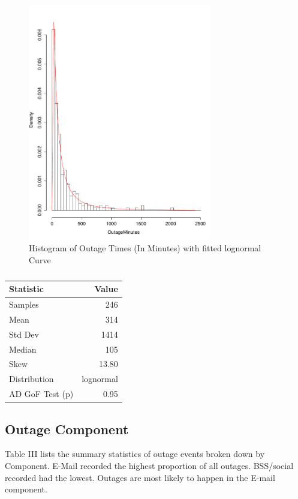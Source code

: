 \documentclass[conference]{IEEEtran}
\begin{document}
\begin{figure}
\begin{center}
\includegraphics[width=8cm]{graph1.pdf} 
\caption{ Histogram of Outage Times (In Minutes) with fitted lognormal Curve}
\end{center}
\label{fig:outagedistribution}
\end{figure}


\begin {table}
\caption{}
\begin{center}
\begin{tabular}{l | r} Statistic & Value 
\\ \hline Samples & 246
\\ Mean & 314
\\ Std Dev & 1414
\\ Median & 105
\\ Skew & 13.80
\\ Distribution & lognormal
\\AD GoF Test (p) & 0.95
\end{tabular}
\end{center}
\end{table}


\subsection{Outage Component}

Table III lists the summary statistics of outage events broken down by Component. E-Mail recorded the highest proportion of all outages. BSS/social recorded had the lowest. Outages are most likely to happen in the E-mail component. \par
\end{document}
